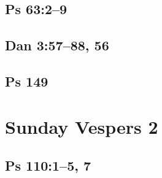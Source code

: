 \subsection{Ps 63:2--9}

{%
\parindent 0pt
\noindent
\ifx\preLilyPondExample \undefined
\else
  \expandafter\preLilyPondExample
\fi
\def\lilypondbook{}%

\ifx\postLilyPondExample \undefined
\else
  \expandafter\postLilyPondExample
\fi
}

\subsection{Dan 3:57--88, 56}

{%
\parindent 0pt
\noindent
\ifx\preLilyPondExample \undefined
\else
  \expandafter\preLilyPondExample
\fi
\def\lilypondbook{}%

\ifx\postLilyPondExample \undefined
\else
  \expandafter\postLilyPondExample
\fi
}

\subsection{Ps 149}

{%
\parindent 0pt
\noindent
\ifx\preLilyPondExample \undefined
\else
  \expandafter\preLilyPondExample
\fi
\def\lilypondbook{}%

\ifx\postLilyPondExample \undefined
\else
  \expandafter\postLilyPondExample
\fi
}




\section{Sunday Vespers 2}

\subsection{Ps 110:1--5, 7}

{%
\parindent 0pt
\noindent
\ifx\preLilyPondExample \undefined
\else
  \expandafter\preLilyPondExample
\fi
\def\lilypondbook{}%

\ifx\postLilyPondExample \undefined
\else
  \expandafter\postLilyPondExample
\fi
}

